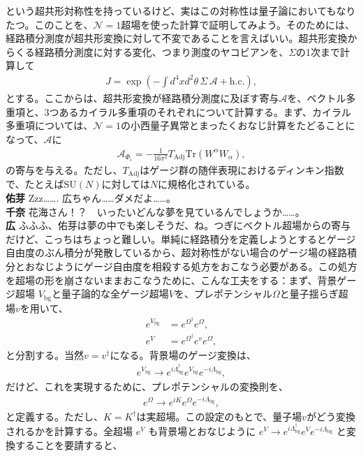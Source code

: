 \documentclass[paper=b5j,fontsize=12Q,jafontsize=12Q,baselineskip=21Q]{jlreq}
\DeclareRobustCommand{\hiron}{\textbf{広 }}
\DeclareRobustCommand{\chinan}{\textbf{千奈 }}
\DeclareRobustCommand{\umen}{\textbf{佑芽 }}
\begin{document}
\begin{refsection}
という超共形対称性を持っているけど、実はこの対称性は量子論においてもなりたつ。このことを、$\mathcal N=1$超場を使った計算で証明してみよう。そのためには、経路積分測度が超共形変換に対して不変であることを言えばいい。超共形変換からくる経路積分測度に対する変化、つまり測度のヤコビアンを、$\Sigma$の1次まで計算して
\begin{align}
  J = \exp \left( - \int d^4x d^2\theta \, \Sigma \, \mathcal{A} + \text{h.c.} \right),
\end{align}
とする。ここからは、超共形変換が経路積分測度に及ぼす寄与$\mathcal A$を、ベクトル多重項と、3つあるカイラル多重項のそれぞれについて計算する。まず、カイラル多重項については、$\mathcal N=1$の小西量子異常とまったくおなじ計算をたどることになって、$\mathcal A$に
\begin{align}
  \mathcal{A}_{\Phi_i} = -\frac{1}{16\pi^2} T_{\text{Adj}} \text{Tr}(W^\alpha W_\alpha),
\end{align}
の寄与を与える。ただし、$T_{\text{Adj}}$はゲージ群の随伴表現におけるディンキン指数で、たとえば$\mathrm{SU}(N)$に対しては$N$に規格化されている。
\\\umen Zzz……. 広ちゃん……ダメだよ……。
\\\chinan 花海さん！？　いったいどんな夢を見ているんでしょうか……。
\\\hiron ふふふ、佑芽は夢の中でも楽しそうだ、ね。つぎにベクトル超場からの寄与だけど、こっちはちょっと難しい。単純に経路積分を定義しようとするとゲージ自由度のぶん積分が発散しているから、超対称性がない場合のゲージ場の経路積分とおなじようにゲージ自由度を相殺する処方をおこなう必要がある。この処方を超場の形を崩さないままおこなうために、こんな工夫をする：まず、背景ゲージ超場 $V_{\text{bg}}$と量子論的な全ゲージ超場$V$を、プレポテンシャル$\Omega$と量子揺らぎ超場$v$を用いて、
\begin{align}
  e^{V_{\text{bg}}} &= e^{\Omega^\dagger} e^\Omega,\\
  e^V &= e^{\Omega^\dagger} e^v e^\Omega,
\end{align}
と分割する。当然$v=v^\dagger$になる。背景場のゲージ変換は、
\begin{align}
  e^{V_{\text{bg}}} \to e^{i\Lambda^\dagger_{\text{bg}}} e^{V_{\text{bg}}} e^{-i\Lambda_{\text{bg}}},
\end{align}
だけど、これを実現するために、プレポテンシャルの変換則を、
\begin{align}
  e^\Omega \to e^{iK} e^\Omega e^{-i\Lambda_{\text{bg}}},
\end{align}
と定義する。ただし、$K=K^\dagger$は実超場。この設定のもとで、量子場$v$がどう変換されるかを計算する。全超場 $e^V$ も背景場とおなじように $e^V \to e^{i\Lambda^\dagger_{\text{bg}}} e^V e^{-i\Lambda_{\text{bg}}}$ と変換することを要請すると、

\end{refsection}
\end{document}
